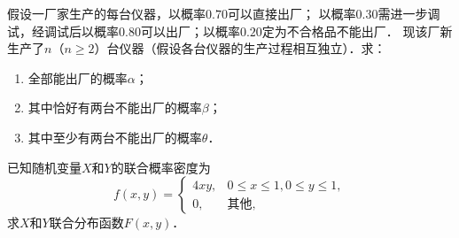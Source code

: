 \documentclass[plain,noanswer,medmath]{../../template/jnuexam}
\begin{document}

\begin{problem}
假设一厂家生产的每台仪器，以概率$0.70$可以直接出厂；
以概率$0.30$需进一步调试，经调试后以概率$0.80$可以出厂；以概率$0.20$定为不合格品不能出厂．
现该厂新生产了$n$（$n \ge 2$）台仪器（假设各台仪器的生产过程相互独立）．求：
\begin{enumerate}
\item 全部能出厂的概率$\alpha$；
\item 其中恰好有两台不能出厂的概率$\beta$；
\item 其中至少有两台不能出厂的概率$\theta$．
\end{enumerate}
\end{problem}



\begin{problem}
已知随机变量$X$和$Y$的联合概率密度为
$$f(x,y) = \begin{cases}
  4xy, & 0 \le x \le 1,0 \le y \le 1, \\
    0, & \text{其他},
\end{cases}$$
求$X$和$Y$联合分布函数$F(x,y)$．
\end{problem}
\end{document}
